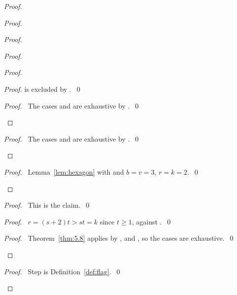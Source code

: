 \begin{proof}
\begin{proof}
\begin{proof}
\begin{proof}
\begin{proof}
\begin{proof}
      is excluded by .~\qed\end{proof}
     \qedstep
     \begin{proof}\pf\ The cases  and  are
      exhaustive by .~\qed\end{proof}
    \end{proof}
    \qedstep
    \begin{proof}\pf\ The cases  and  are exhaustive by
     .~\qed\end{proof}
   \end{proof}
   \qedstep
   \begin{proof}\pf\ Lemma~\ref{lem:hexagon} with  and $b=v=3$,
    $r=k=2$.~\qed\end{proof}
  \end{proof}
  \begin{proof}\pf\ This is the claim.~\qed\end{proof}
  \begin{proof}\pf\ $r=(s+2)t>st=k$ since $t\ge1$, against .~\qed\end{proof}
  \qedstep
  \begin{proof}\pf\ Theorem~\ref{thm:5.8} applies by ,  and
   , so the cases are exhaustive.~\qed\end{proof}
 \end{proof}
 \qedstep
 \begin{proof}\pf\ Step  is Definition~\ref{def:flag}.~\qed\end{proof}
\end{proof}

